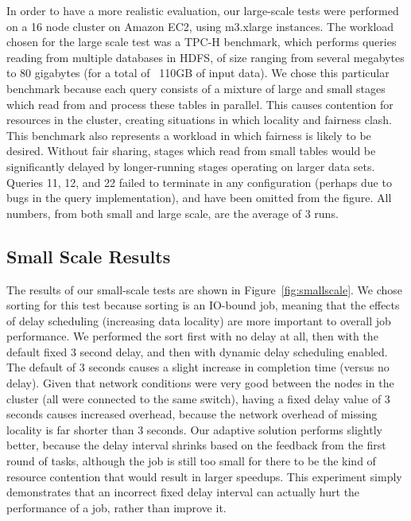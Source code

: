 In order to have a more realistic evaluation, our large-scale tests were
performed on a 16 node cluster on Amazon EC2, using m3.xlarge instances. The
workload chosen for the large scale test was a TPC-H benchmark, which
performs queries reading from multiple databases in HDFS, of size ranging from
several megabytes to 80 gigabytes (for a total of ~110GB of input data).
We chose this particular benchmark because each query
consists of a mixture of large and small stages which read from and process these tables
in parallel. This causes contention for resources in the cluster, creating
situations in which locality and fairness clash. This benchmark also represents
a workload in which fairness is likely to be desired. Without fair sharing,
stages which read from small tables would be significantly delayed by
longer-running stages operating on larger data sets. Queries 11, 12, and 22 failed
to terminate in any configuration (perhaps due to bugs in the query implementation),
and have been omitted from the figure.
All numbers, from both small and large scale, are the average of 3 runs.

\subsection{Small Scale Results}
The results of our small-scale tests are shown in Figure~\ref{fig:smallscale}.
We chose sorting for this test because sorting is an IO-bound job, meaning that
the effects of delay scheduling (increasing data locality) are more important
to overall job performance.
We performed the sort first with no delay at all, then with the default fixed 3 second delay,
and then with dynamic delay scheduling enabled. The default of
3 seconds causes a slight increase in completion time (versus no delay). Given
that network conditions were very good between the nodes in the cluster (all were
connected to the same switch), having a fixed delay value of 3 seconds causes
increased overhead, because the network overhead of missing locality is far
shorter than 3 seconds. Our adaptive solution performs slightly better, because
the delay interval shrinks based on the feedback from the first round of tasks,
although the job is still too small for there to be the kind of resource
contention that would result in larger speedups. This experiment simply
demonstrates that an incorrect fixed delay interval can actually hurt the
performance of a job, rather than improve it.

